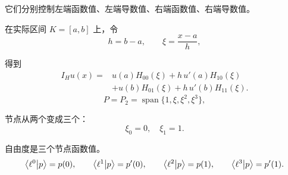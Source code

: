 它们分别控制左端函数值、左端导数值、右端函数值、右端导数值。

在实际区间 \(K=[a,b]\) 上，令
\[
    h=b-a,\qquad \xi=\frac{x-a}{h},
\]

得到
\[
    \boxed{
        \begin{aligned}
            I_Hu(x)={} & u(a)H_{00}(\xi)
            +h\,u'(a)H_{10}(\xi)          \\
                       & +u(b)H_{01}(\xi)
            +h\,u'(b)H_{11}(\xi).
        \end{aligned}
    }
\]
\[
    P=P_2=\operatorname{span}\{1,\xi,\xi^2,\xi^3\},
\]

节点从两个变成三个：
\[
    \xi_0=0,\quad \xi_1=1.
\]

自由度是三个节点函数值。
\[
    \braket{\ell^0}{p}=p(0),
    \qquad \braket{\ell^1}{p}=p'(0),
    \qquad \braket{\ell^2}{p}=p(1),
    \qquad \braket{\ell^3}{p}=p'(1).
\]

